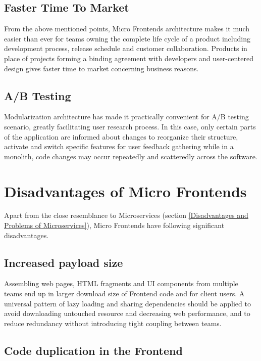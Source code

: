 \documentclass[a4paper]{book}
\begin{document}
\subsection{Faster Time To Market}
From the above mentioned points, Micro Frontends architecture makes it much easier than ever for teams owning the complete life cycle of a product including development process, release schedule and customer collaboration. Products in place of projects forming a binding agreement with developers and user-centered design gives faster time to market concerning business reasons.

\subsection{A/B Testing}
Modularization architecture has made it practically convenient for A/B testing scenario, greatly facilitating  user research process. In this case, only certain parts of the application are informed about changes to reorganize their structure, activate and switch specific features for user feedback gathering while in a monolith, code changes may occur repeatedly and scatteredly across the software. \cite{Rap20}

\section{Disadvantages of Micro Frontends}

Apart from the close resemblance to Microservices (section \ref{Disadvantages and Problems of Microservices}), Micro Frontends have following significant disadvantages.

\subsection{Increased payload size}

Assembling web pages, HTML fragments and UI components from multiple teams end up in larger download size of Frontend code and for client users. A universal pattern of lazy loading and sharing dependencies should be applied to avoid downloading untouched resource and decreasing web performance, and to reduce redundancy without introducing tight coupling between teams. 

\subsection{Code duplication in the Frontend}
\end{document}
